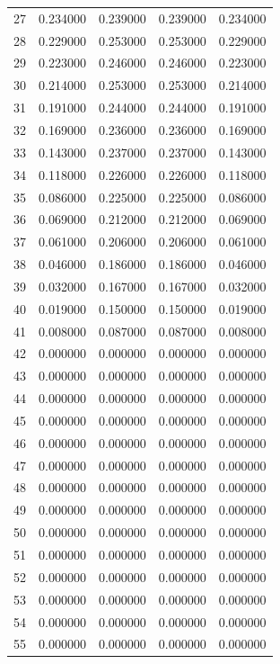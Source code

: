 \begin{tabular}{lrrrr}
27 & 0.234000 & 0.239000 & 0.239000 & 0.234000 \\
28 & 0.229000 & 0.253000 & 0.253000 & 0.229000 \\
29 & 0.223000 & 0.246000 & 0.246000 & 0.223000 \\
30 & 0.214000 & 0.253000 & 0.253000 & 0.214000 \\
31 & 0.191000 & 0.244000 & 0.244000 & 0.191000 \\
32 & 0.169000 & 0.236000 & 0.236000 & 0.169000 \\
33 & 0.143000 & 0.237000 & 0.237000 & 0.143000 \\
34 & 0.118000 & 0.226000 & 0.226000 & 0.118000 \\
35 & 0.086000 & 0.225000 & 0.225000 & 0.086000 \\
36 & 0.069000 & 0.212000 & 0.212000 & 0.069000 \\
37 & 0.061000 & 0.206000 & 0.206000 & 0.061000 \\
38 & 0.046000 & 0.186000 & 0.186000 & 0.046000 \\
39 & 0.032000 & 0.167000 & 0.167000 & 0.032000 \\
40 & 0.019000 & 0.150000 & 0.150000 & 0.019000 \\
41 & 0.008000 & 0.087000 & 0.087000 & 0.008000 \\
42 & 0.000000 & 0.000000 & 0.000000 & 0.000000 \\
43 & 0.000000 & 0.000000 & 0.000000 & 0.000000 \\
44 & 0.000000 & 0.000000 & 0.000000 & 0.000000 \\
45 & 0.000000 & 0.000000 & 0.000000 & 0.000000 \\
46 & 0.000000 & 0.000000 & 0.000000 & 0.000000 \\
47 & 0.000000 & 0.000000 & 0.000000 & 0.000000 \\
48 & 0.000000 & 0.000000 & 0.000000 & 0.000000 \\
49 & 0.000000 & 0.000000 & 0.000000 & 0.000000 \\
50 & 0.000000 & 0.000000 & 0.000000 & 0.000000 \\
51 & 0.000000 & 0.000000 & 0.000000 & 0.000000 \\
52 & 0.000000 & 0.000000 & 0.000000 & 0.000000 \\
53 & 0.000000 & 0.000000 & 0.000000 & 0.000000 \\
54 & 0.000000 & 0.000000 & 0.000000 & 0.000000 \\
55 & 0.000000 & 0.000000 & 0.000000 & 0.000000 \\

\end{tabular}
